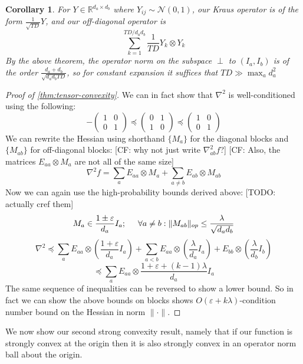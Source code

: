 \documentclass{article}
\newtheorem{corollary}[theorem]{Corollary}
\newcommand{\R}{{\mathbb{R}}}
\newcommand\eps{\varepsilon}
\newcommand{\CF}[1]{{\color{purple}[CF: #1]}}
\newcommand{\TODO}[1]{{\color{blue}[TODO: #1]}}
\begin{document}
\begin{corollary}
For $Y \in \R^{d_{a} \times d_{b}}$ where $Y_{ij} \sim \mathcal{N}(0,1)$, our Kraus operator is of the form $\frac{1}{\sqrt{TD}} Y$, and our off-diagonal operator is
\[ \sum_{k=1}^{TD/d_{a}d_{b}} \frac{1}{TD} Y_{k} \otimes Y_{k}   \]
By the above theorem, the operator norm on the subspace $\perp$ to $(I_{a},I_{b})$ is of the order $\frac{d_{a}+d_{b}}{\sqrt{d_{a} d_{b} TD}}$, so for constant expansion it suffices that $TD \gg \max_{a} d_{a}^{2}$
\end{corollary}
\begin{proof}[Proof of \cref{thm:tensor-convexity}]
We can in fact show that $\nabla^{2}$ is well-conditioned using the following:
\[ -\begin{pmatrix} 1 & 0 \\ 0 & 1 \end{pmatrix}
\preceq \begin{pmatrix} 0 & 1 \\ 1 & 0 \end{pmatrix}
\preceq \begin{pmatrix} 1 & 0 \\ 0 & 1 \end{pmatrix}
\]
We can rewrite the Hessian using shorthand $\{M_{a}\}$ for the diagonal blocks and $\{M_{ab}\}$ for off-diagonal blocks: \CF{why not just write $\nabla^2_{ab}f$?} \CF{Also, the matrices $E_{aa} \otimes M_a$ are not all of the same size}
\[ \nabla^{2} f = \sum_{a} E_{aa} \otimes M_{a} + \sum_{a \neq b} E_{ab} \otimes M_{ab}  \]
Now we can again use the high-probability bounds derived above: \TODO{actually cref them}
\[ M_{a} \in \frac{1 \pm \eps}{d_{a}} I_{a}; \hspace{5mm} \forall a \neq b: \|M_{ab}\|_{op} \leq \frac{\lambda}{\sqrt{d_{a} d_{b}}}   \]
\[ \nabla^{2} \preceq \sum_{a} E_{aa} \otimes \left( \frac{1+\eps}{d_{a}} I_{a} \right) + \sum_{a < b} E_{aa} \otimes \left( \frac{\lambda}{d_{a}} I_{a} \right) + E_{bb} \otimes \left( \frac{\lambda}{d_{b}} I_{b} \right)    \]
\[ \preceq \sum_{a} E_{aa} \otimes \frac{1+\eps+(k-1)\lambda}{d_{a}} I_{a}  \]
The same sequence of inequalities can be reversed to show a lower bound. So in fact we can show the above bounds on blocks shows $O(\eps + k \lambda)$-condition number bound on the Hessian in norm $\|\cdot\|$.
\end{proof}
We now show our second strong convexity result, namely that if our function is strongly convex at the origin then it is also strongly convex in an operator norm ball about the origin.
\end{document}
